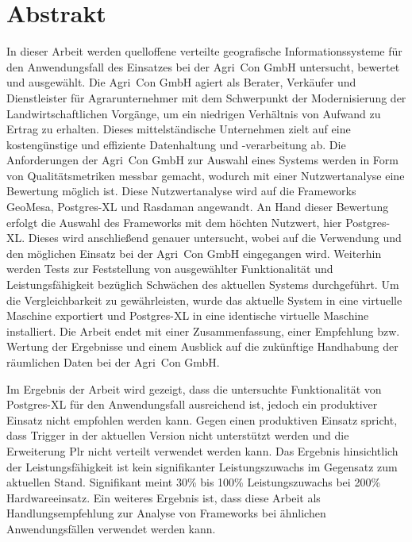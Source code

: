 
\chapter*{Abstrakt}
\label{sec:Abstrakt}
In dieser Arbeit werden quelloffene verteilte geografische Informationssysteme für den Anwendungsfall des Einsatzes bei der Agri~Con GmbH untersucht, bewertet und ausgewählt.
Die Agri~Con GmbH agiert als Berater, Verkäufer und Dienstleister für Agrarunternehmer mit dem Schwerpunkt der Modernisierung der Landwirtschaftlichen Vorgänge, um ein niedrigen Verhältnis von Aufwand zu Ertrag zu erhalten.
Dieses mittelständische Unternehmen zielt auf eine kostengünstige und effiziente Datenhaltung und -verarbeitung ab.
Die Anforderungen der Agri~Con GmbH zur Auswahl eines Systems werden in Form von Qualitätsmetriken messbar gemacht, wodurch mit einer Nutzwertanalyse eine Bewertung möglich ist.
Diese Nutzwertanalyse wird auf die Frameworks GeoMesa, Postgres-XL und Rasdaman angewandt.
An Hand dieser Bewertung erfolgt die Auswahl des Frameworks mit dem höchten Nutzwert, hier Postgres-XL.
Dieses wird anschließend genauer untersucht, wobei auf die Verwendung und den möglichen Einsatz bei der Agri~Con GmbH eingegangen wird.
Weiterhin werden Tests zur Feststellung von ausgewählter Funktionalität und Leistungsfähigkeit bezüglich Schwächen des aktuellen Systems durchgeführt.
Um die Vergleichbarkeit zu gewährleisten, wurde das aktuelle System in eine virtuelle Maschine exportiert und Postgres-XL in eine identische virtuelle Maschine installiert.
Die Arbeit endet mit einer Zusammenfassung, einer Empfehlung bzw. Wertung der Ergebnisse und einem Ausblick auf die zukünftige Handhabung der räumlichen Daten bei der Agri~Con GmbH.

Im Ergebnis der Arbeit wird gezeigt, dass die untersuchte Funktionalität von Postgres-XL für den Anwendungsfall ausreichend ist, jedoch ein produktiver Einsatz nicht empfohlen werden kann.
Gegen einen produktiven Einsatz spricht, dass Trigger in der aktuellen Version nicht unterstützt werden und die Erweiterung Plr nicht verteilt verwendet werden kann.
Das Ergebnis hinsichtlich der Leistungsfähigkeit ist kein signifikanter Leistungszuwachs im Gegensatz zum aktuellen Stand.
Signifikant meint 30\%{} bis 100\%{} Leistungszuwachs bei 200\%{} Hardwareeinsatz.
Ein weiteres Ergebnis ist, dass diese Arbeit als Handlungsempfehlung zur Analyse von Frameworks bei ähnlichen Anwendungsfällen verwendet werden kann.